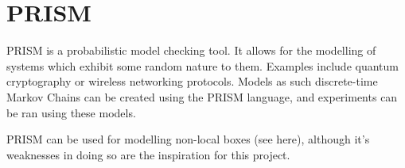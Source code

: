 \documentclass[report.tex]{subfiles}
\begin{document}
\section{PRISM} %
\label{sec:prism}
PRISM is a probabilistic model checking tool. It allows for
the modelling of systems which exhibit some random nature to them. Examples
include quantum cryptography or wireless networking protocols. Models as such
discrete-time Markov Chains can be created using the PRISM language, and
experiments can be ran using these models.

PRISM can be used for modelling non-local boxes (see here), although it's
weaknesses in doing so are the inspiration for this project.

\newpage
\end{document}
